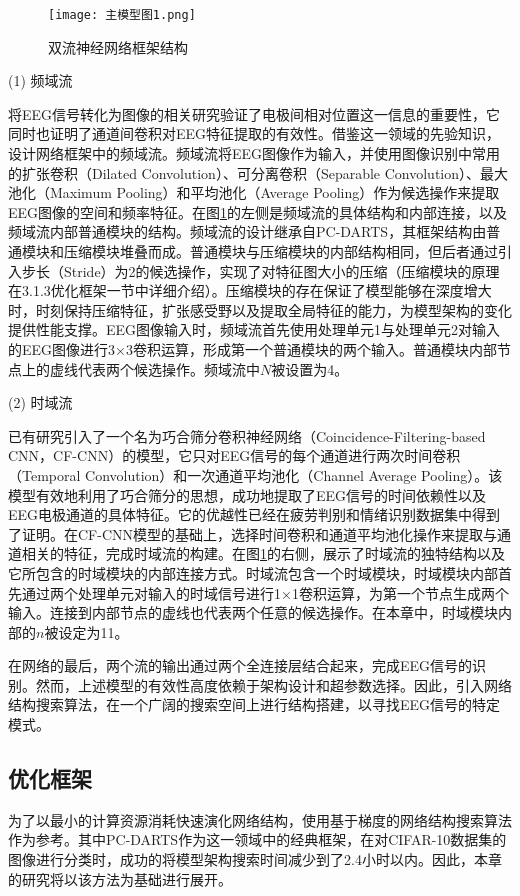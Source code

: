 \begin{figure}[!h]
	\centering
	\texttt{[image: 主模型图1.png]}
	\caption{双流神经网络框架结构} 
	\label{fig3-1}
\end{figure}

(1) 频域流

将EEG信号转化为图像的相关研究\cite{3-3}验证了电极间相对位置这一信息的重要性，它同时也证明了通道间卷积对EEG特征提取的有效性。借鉴这一领域的先验知识，设计网络框架中的频域流。频域流将EEG图像作为输入，并使用图像识别中常用的扩张卷积（Dilated Convolution）、可分离卷积（Separable Convolution）、最大池化（Maximum Pooling）和平均池化（Average Pooling）作为候选操作来提取EEG图像的空间和频率特征。在图\ref{fig3-1}的左侧是频域流的具体结构和内部连接，以及频域流内部普通模块的结构。频域流的设计继承自PC-DARTS，其框架结构由普通模块和压缩模块堆叠而成。普通模块与压缩模块的内部结构相同，但后者通过引入步长（Stride）为2的候选操作，实现了对特征图大小的压缩（压缩模块的原理在3.1.3优化框架一节中详细介绍）。压缩模块的存在保证了模型能够在深度增大时，时刻保持压缩特征，扩张感受野以及提取全局特征的能力，为模型架构的变化提供性能支撑。EEG图像输入时，频域流首先使用处理单元1与处理单元2对输入的EEG图像进行3×3卷积运算，形成第一个普通模块的两个输入。普通模块内部节点上的虚线代表两个候选操作。频域流中$N$被设置为4。

(2) 时域流

已有研究\cite{3-8}引入了一个名为巧合筛分卷积神经网络（Coincidence-Filtering-based CNN，CF-CNN）的模型，它只对EEG信号的每个通道进行两次时间卷积（Temporal Convolution）和一次通道平均池化（Channel Average Pooling）。该模型有效地利用了巧合筛分的思想，成功地提取了EEG信号的时间依赖性以及EEG电极通道的具体特征。它的优越性已经在疲劳判别和情绪识别数据集中得到了证明。在CF-CNN模型的基础上，选择时间卷积和通道平均池化操作来提取与通道相关的特征，完成时域流的构建。在图\ref{fig3-1}的右侧，展示了时域流的独特结构以及它所包含的时域模块的内部连接方式。时域流包含一个时域模块，时域模块内部首先通过两个处理单元对输入的时域信号进行1×1卷积运算，为第一个节点生成两个输入。连接到内部节点的虚线也代表两个任意的候选操作。在本章中，时域模块内部的$n$被设定为11。

在网络的最后，两个流的输出通过两个全连接层结合起来，完成EEG信号的识别。然而，上述模型的有效性高度依赖于架构设计和超参数选择。因此，引入网络结构搜索算法，在一个广阔的搜索空间上进行结构搭建，以寻找EEG信号的特定模式。

\subsection{优化框架}
为了以最小的计算资源消耗快速演化网络结构，使用基于梯度的网络结构搜索算法作为参考。其中PC-DARTS作为这一领域中的经典框架，在对CIFAR-10数据集的图像进行分类时，成功的将模型架构搜索时间减少到了2.4小时以内。因此，本章的研究将以该方法为基础进行展开。

